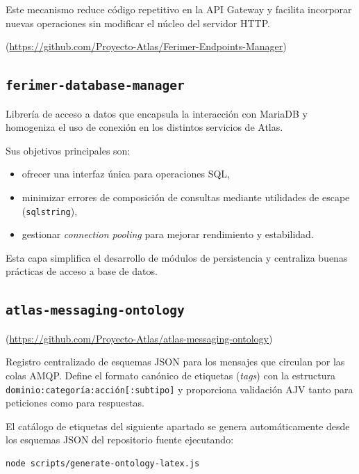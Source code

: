 Este mecanismo reduce código repetitivo en la API Gateway y facilita incorporar nuevas operaciones sin modificar el núcleo del servidor HTTP.

(\url{https://github.com/Proyecto-Atlas/Ferimer-Endpoints-Manager})

\subsection{\texttt{ferimer-database-manager}}

Librería de acceso a datos que encapsula la interacción con MariaDB y homogeniza el uso de conexión en los distintos servicios de Atlas.

Sus objetivos principales son:

\begin{itemize}
\item ofrecer una interfaz única para operaciones SQL,
\item minimizar errores de composición de consultas mediante utilidades de escape (\texttt{sqlstring}),
\item gestionar \textit{connection pooling} para mejorar rendimiento y estabilidad.
\end{itemize}

Esta capa simplifica el desarrollo de módulos de persistencia y centraliza buenas prácticas de acceso a base de datos.

\subsection{\texttt{atlas-messaging-ontology}}\label{sec:atlas-messaging-ontology}

(\url{https://github.com/Proyecto-Atlas/atlas-messaging-ontology})

Registro centralizado de esquemas JSON para los mensajes que circulan por las colas AMQP.
Define el formato canónico de etiquetas (\textit{tags}) con la estructura \texttt{dominio:categoría:acción[:subtipo]}
y proporciona validación AJV tanto para peticiones como para respuestas.

El catálogo de etiquetas del siguiente apartado se genera automáticamente
desde los esquemas JSON del repositorio fuente ejecutando:

\begin{lstlisting}[language=bash, caption={Regenerar catálogo de etiquetas}]
node scripts/generate-ontology-latex.js
\end{lstlisting}


